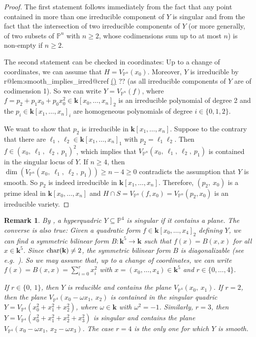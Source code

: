 \documentclass[english,11pt,reqno]{amsart}
\makeatletter
\newcommand{\sub}{\subseteq}
\newcommand{\Pfour}{\mathbb{P}^4}
\newcommand{\Pn}{\mathbb{P}^n}
\newcommand{\VPfour}{V_{\Pfour}}
\newcommand{\VPn}{V_{\Pn}}
\newcommand{\kk}{\mathbf{k}}
\newcommand{\kPfour}{\kk[x_0,\dots,x_4]}
\newcommand{\kPn}{\kk[x_0,\dots,x_n]}
\newtheorem{rmk}[thm]{Remark}
\newcounter{subcreftmpcnt} %
\newcommand\alphsubformat[1]{(\roman{#1})}
\newcommand\subcref[2][\alphsubformat]{%
	\ifcsname r@#2@cref\endcsname
	\cref@getcounter {#2}{\mylabel}%
	\setcounter{subcreftmpcnt}{\mylabel}%
	\hyperref[#2]{\alphsubformat{subcreftmpcnt}}%
	\else ?? \fi}
\makeatother
\begin{document}
% 
\begin{proof}
	The first statement follows immediately from the fact that any point contained in more than one irreducible component of $Y$ is singular and from the fact that the intersection of two irreducible components of $Y$ (or more generally, of two subsets of $\Pn$ with $n\geq2$, whose codimensions sum up to at most $n$) is non-empty if $n\geq 2$.\par
	The second statement can be checked in coordinates: Up to a change of coordinates, we can assume that $H=\VPn(x_0)$. Moreover, $Y$ is irreducible by \subcref{lem:smooth_implies_irred} (as all irreducible components of $Y$ are of codimension 1). So we can write $Y= \VPn(f)$, where $f = p_2 + p_1x_0 + p_0 x_0^2\in \kPn_2$ is an irreducible polynomial of degree 2 and the $p_i\in \kk[x_1,\dots,x_n]_i$ are homogeneous polynomials of degree $i\in \{0,1,2\}$. \par
	We want to show that $p_2$ is irreducible in $\kk[x_1,\dots,x_n]$. Suppose to the contrary that there are $\ell_1,\: \ell_2 \in \kk[x_1,\dots,x_n]_1$ with $p_2 = \ell_1  \ell_2$. Then $f\in (x_0,\:\ell_1,\:\ell_2,\:p_1)^2$, which implies that $\VPn(x_0,\:\ell_1,\:\ell_2,\:p_1)$ is contained in the singular locus of $Y$. 
If $n\geq 4$, then $\dim(\VPn(x_0,\:\ell_1,\:\ell_2,\:p_1)) \geq n-4 \geq 0$ contradicts the assumption that $Y$ is smooth. So $p_2$ is indeed irreducible in $\kk[x_1,\dots,x_n]$. Therefore, $(p_2,\:x_0)$ is a prime ideal in $ \kPn$ and $H \cap S = \VPn(f,x_0) = \VPn(p_2,x_0)$ is an irreducible variety. 
\end{proof}
%
%
\begin{rmk} \label{rmk:singular_hyperquadric_contains_plane}
By , a hyperquadric $Y\sub \Pfour$ is singular if it contains a plane. The converse is also true: 
Given a quadratic form $f\in\kPfour_2$ defining $Y$, we can find a symmetric bilinear form $B:\kk^5\rightarrow \kk$ such that $f(x)=B(x,x)$ for all $x\in\kk^5$. Since $\textup{char}(\kk)\neq 2$, the symmetric bilinear form $B$ is diagonalizable (see e.g.\ \cite[Thm.\ 6.5]{Jacobson-Quadratic_form_diagonalizable}). So we may assume that, up to a change of coordinates, we can write $f(x)=B(x,x)=\sum_{i=0}^r x_i^2$ with $x=(x_0,\dots,x_4) \in \kk^5$ and $r\in\{0,\dots,4\} $. \par If $r\in \{0,\:1\}$, then $Y$ is reducible and contains the plane $\VPfour(x_0,\:x_1)$. If $r=2$, then the plane $\VPfour(x_0-\omega x_1,\:x_2)$ is contained in the singular quadric $Y=\VPfour(x_0^2+x_1^2+x_2^2)$, where $\omega \in \kk$ with $\omega^2=-1$. Similarly, $r=3$, then $Y=\VPfour(x_0^2+x_1^2+x_2^2+x_3^2)$ is singular and contains the plane $\VPfour(x_0-\omega x_1,\: x_2-\omega x_3)$. The case $r=4$ is the only one for which $Y$ is smooth.
\end{rmk}
\end{document}
